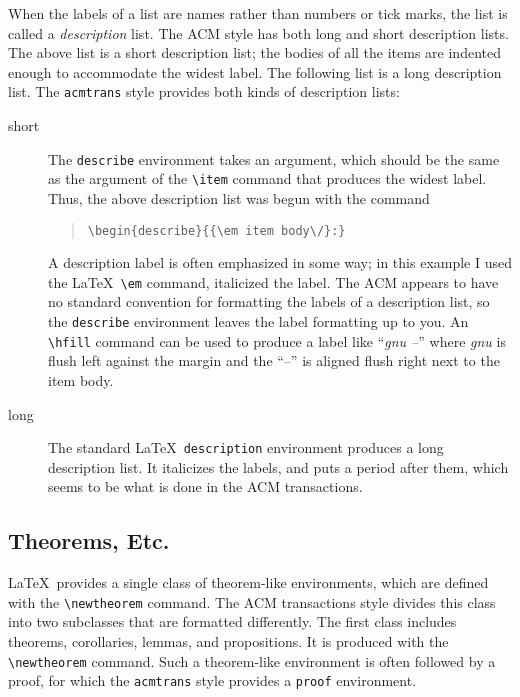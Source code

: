 \documentclass[hyperref]{acmtrans2e}
\begin{document}
When the labels of a list are names rather than numbers or tick marks,
the list is called a {\em description\/} list.
The ACM style
has both long and short description lists.  The above list is a short
description list; the bodies of all the items are indented enough to
accommodate the widest label.
The following list is a long description list.
The {\tt acmtrans} style provides both kinds of description lists:
\begin{description}
\item[short]
The {\tt describe} environment 
takes an argument, which should be the same as the argument of the \verb|\item|
command that produces the widest label.  Thus, the above description
list was begun with the command
\begin{quote}
\begin{verbatim}
\begin{describe}{{\em item body\/}:}
\end{verbatim}
\end{quote}

A description label is often emphasized in some way; in this example I
used the \LaTeX\ \verb|\em| command, italicized the label.  The ACM
appears to have no standard convention for formatting the labels of a
description list, so the {\tt describe} environment leaves the label
formatting up to you.  An \verb|\hfill| command can be used to produce
a label like ``{\em gnu \hfill --\/}'' where {\em gnu\/} is flush left
against the margin and the ``--'' is aligned flush right next to the
item body.

\item[long]
The standard \LaTeX\ {\tt description} environment produces a long
description list.  It italicizes the labels, and puts a period after
them, which seems to be what is done in the ACM transactions.
\end{description}

\subsection{Theorems, Etc.}


\LaTeX\ provides a single class of theorem-like environments, which are
defined with the \verb|\newtheorem| command.  The ACM transactions
style divides this class into two subclasses that are formatted
differently.  The first class includes theorems, corollaries, lemmas,
and propositions.  It is produced with the \verb|\newtheorem| command.
Such a theorem-like environment is often followed by a proof, for which
the {\tt acmtrans} style provides a {\tt proof} environment.
\end{document}
